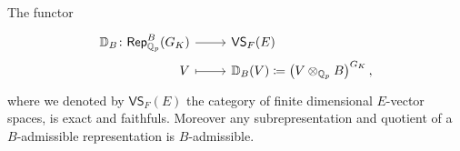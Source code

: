 \begin{prop}
	The functor
	\begin{equation*}
	\begin{tikzcd}[row sep = 0ex
		,/tikz/column 1/.append style={anchor=base east}
		,/tikz/column 2/.append style={anchor=base west}]
		\mathbb{D}_B\colon \mathsf{Rep}_{\mathbb{Q}_p}^B(G_K) \arrow[r, "", rightarrow] &
		\mathsf{VS}_F(E) \\
		V \arrow[r, "", mapsto] & 
		\mathbb{D}_B(V) \coloneqq \left( V \otimes_{\mathbb{Q}_p} B \right)^{G_K}
	,\end{tikzcd}
	\end{equation*} 
	where we denoted by $\mathsf{VS}_F(E)$ the category of finite dimensional $E$-vector spaces,
	is exact and faithfuls.
	Moreover any subrepresentation and quotient of a $B$-admissible
	representation is $B$-admissible.
\end{prop}

